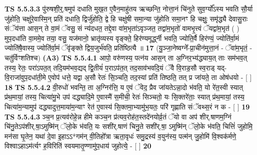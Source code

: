 \documentclass[17pt]{extarticle}
\begin{document}
                  \newline
                                \textbf{ TS 5.5.3.3} \newline
                  पु॑रुषशी॒र्॒.षमुप॑ दधाति मुख॒त ए॒वैन॒माहु॑तय ऋच्छन्ति॒ नोत्ता॒नं चि॑नुते सुव॒र्ग्यो᳚ऽस्य भवति सौ॒र्या जु॑होति॒ चक्षु॑रे॒वास्मि॒न् प्रति॑ दधाति॒ द्विर्जु॑होति॒ द्वे हि चक्षु॑षी समा॒न्या जु॑होति समा॒नꣳ हि चक्षुः॒ समृ॑द्ध्यै देवासु॒राः संॅय॑त्ता आस॒न् ते वा॒मं ॅवसु॒ सं न्य॑दधत॒ तद्दे॒वा वा॑म॒भृता॑ऽवृञ्जत॒ तद्वा॑म॒भृतो॑ वामभृ॒त्त्वं ॅयद्वा॑म॒भृत॑ ( ) मुप॒दधा॑ति वा॒ममे॒व तया॒ वसु॒ यज॑मानो॒ भ्रातृ॑व्यस्य वृङ्क्ते॒ हिर॑ण्यमूर्द्ध्नी भवति॒ ज्योति॒र्वै हिर॑ण्यं॒ ज्योति॑र्वा॒मं ज्योति॑षै॒वास्य॒ ज्योति॑र्वा॒मं ॅवृ॑ङ्क्ते द्विय॒जुर्भ॑वति॒ प्रति॑ष्ठित्यै ॥ \textbf{  17 } \newline
                  \newline
                      (यु॒ञ्जा॒नेष्वग्ने᳚-प्रा॒चीन॑मुत्ता॒नं - ॅवा॑म॒भृतं॒ - चतु॑र्विꣳशतिश्च)  \textbf{(A3)} \newline \newline
                                        \textbf{ TS 5.5.4.1} \newline
                  आपो॒ वरु॑णस्य॒ पत्न॑य आस॒न् ता अ॒ग्निर॒भ्य॑द्ध्याय॒त् ताः सम॑भव॒त् तस्य॒ रेतः॒ परा॑ऽपत॒त् तदि॒यम॑भव॒द्यद् द्वि॒तीयं॑ प॒राऽप॑त॒त् तद॒साव॑भवदि॒यं ॅवै वि॒राड॒सौ स्व॒राड् यद्-वि॒राजा॑वुप॒दधा॑ती॒मे ए॒वोप॑ धत्ते॒ यद्वा अ॒सौ रेतः॑ सि॒ञ्चति॒ तद॒स्यां प्रति॑ तिष्ठति॒ तत् प्र जा॑यते॒ ता ओष॑धयो - [  ] \textbf{  18} \newline
                  \newline
                                \textbf{ TS 5.5.4.2} \newline
                  वी॒रुधो॑ भवन्ति॒ ता अ॒ग्निर॑त्ति॒ य ए॒वं ॅवेद॒ प्रैव जा॑यतेऽन्ना॒दो भ॑वति॒ यो रे॑त॒स्वी स्यात् प्र॑थ॒मायां॒ तस्य॒ चित्या॑मु॒भे उप॑ दद्ध्यादि॒मे ए॒वास्मै॑ स॒मीची॒ रेतः॑ सिञ्चतो॒ यः सि॒क्तरे॑ताः॒ स्यात् प्र॑थ॒मायां॒ तस्य॒ चित्या॑म॒न्यामुप॑ दद्ध्यादुत्त॒माया॑म॒न्याꣳ रेत॑ ए॒वास्य॑ सि॒क्तमा॒भ्यामु॑भ॒यतः॒ परि॑ गृह्णाति संॅवथ्स॒रं न क - [  ] \textbf{  19} \newline
                  \newline
                                \textbf{ TS 5.5.4.3} \newline
                  ञ्च॒न प्र॒त्यव॑रोहे॒न्न हीमे कञ्च॒न प्र॑त्यव॒रोह॑त॒स्तदे॑नयोर्व्र॒तं ॅयो वा अप॑ शीर्.षाणम॒ग्निं चि॑नु॒तेऽप॑शीर्.षा॒ऽमुष्मि॑न् ॅलो॒के भ॑वति॒ यः सशी॑र्.षाणं चिनु॒ते सशी॑र्.षा॒ ऽमुष्मि॑न् ॅलो॒के भ॑वति॒ चित्तिं॑ जुहोमि॒ मन॑सा घृ॒तेन॒ यथा॑ दे॒वा इ॒हाऽऽ*गम॑न् वी॒तिहो᳚त्रा ऋता॒वृधः॑ समु॒द्रस्य॑ व॒युन॑स्य॒ पत्म॑न् जु॒होमि॑ वि॒श्वक॑र्मणे॒ विश्वाऽहाऽम॑र्त्यꣳ ह॒विरिति॑ स्वयमातृ॒ण्णामु॑प॒धाय॑ जुहोत्ये॒ - [  ] \textbf{  20} \newline
\end{document}
